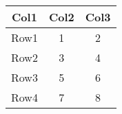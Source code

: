 \documentclass{article}
\begin{document}
\begin{tabular}{ |c|c|c| }
\hline
Col1 & Col2 & Col3 \\
\hline
Row1 & 1 & 2 \\
\hline
Row2 & 3 & 4 \\
\hline
Row3 & 5 & 6 \\
\hline
Row4 & 7 & 8 \\
\hline
\end{tabular}
\end{document}
